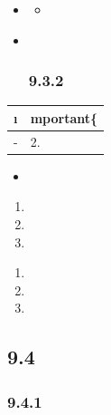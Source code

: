 \important{}

\begin{itemize}
\item
  \begin{itemize}
  \tightlist
  \item
  \end{itemize}
\item ~
  \hypertarget{section-11}{%
  \subsubsection{9.3.2}\label{section-11}}
\end{itemize}

\important{}

\begin{longtable}[]{@{}ll@{}}
\toprule\noalign{}
\i & mportant\{} \\
\midrule\noalign{}
\endhead
\bottomrule\noalign{}
\endlastfoot
- & 2. \important{} \\
\end{longtable}

\begin{itemize}
\item
  \important{}
\end{itemize}

\begin{enumerate}
\def\labelenumi{\arabic{enumi}.}
\item
  \important{}
\item
  \important{}
\item
  \important{}
\end{enumerate}

\important{}

\begin{enumerate}
\def\labelenumi{\arabic{enumi}.}
\item
  \important{}
\item
  \important{}
\item
  \important{}
\end{enumerate}

\hypertarget{section-12}{%
\subsection{9.4}\label{section-12}}

\hypertarget{section-13}{%
\subsubsection{9.4.1}\label{section-13}}

